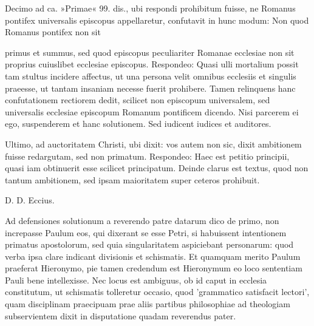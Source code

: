Decimo ad ca. »Primae« 99. dis., ubi respondi prohibitum fuisse, ne Romanus pontifex universalis episcopus appellaretur, confutavit in hunc modum: Non quod Romanus pontifex non sit

primus et summus, sed quod episcopus peculiariter Romanae ecclesiae non sit proprius cuiuslibet ecclesiae episcopus. Respondeo: Quasi ulli mortalium possit tam stultus incidere affectus, ut una persona velit omnibus ecclesiis et singulis praeesse, ut tantam insaniam necesse fuerit prohibere. Tamen relinquens hanc confutationem rectiorem dedit, scilicet non episcopum universalem, sed universalis ecclesiae episcopum Romanum pontificem dicendo. Nisi parcerem ei ego, suspenderem et hanc solutionem. Sed iudicent iudices et auditores.

Ultimo, ad auctoritatem Christi, ubi dixit: vos autem non sic, dixit ambitionem fuisse redargutam, sed non primatum. Respondeo: Haec est petitio principii, quasi iam obtinuerit esse scilicet principatum. Deinde clarus est textus, quod non tantum ambitionem, sed ipsam maioritatem super ceteros prohibuit.

D. D. Eccius.

Ad defensiones solutionum a reverendo patre datarum dico de primo, non increpasse Paulum eos, qui dixerant se esse Petri, si habuissent intentionem primatus apostolorum, sed quia singularitatem aspiciebant personarum: quod verba ipsa clare indicant divisionis et schismatis. Et quamquam merito Paulum praeferat Hieronymo, pie tamen credendum est Hieronymum eo loco sententiam Pauli bene intellexisse. Nec locus est ambiguus, ob id caput in ecclesia constitutum, ut schismatis tolleretur occasio, quod 'grammatico satisfacit lectori', quam disciplinam praecipuam prae aliis partibus philosophiae ad theologiam subservientem dixit in disputatione quadam reverendus pater.

